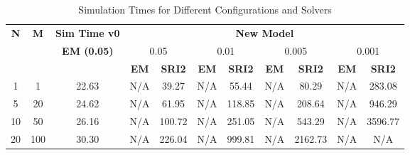 
\begin{table}[ht]
\centering
\caption{Simulation Times for Different Configurations and Solvers}
\begin{tabular}{cc|c|cccccccc}
\toprule
\multirow{2}{*}{\textbf{N}} & \multirow{2}{*}{\textbf{M}} & \textbf{Sim Time v0} & \multicolumn{8}{c}{\textbf{New Model}} \\
\cmidrule(lr){3-11}
 &  & \textbf{EM (0.05)} & \multicolumn{2}{c}{0.05} & \multicolumn{2}{c}{0.01} & \multicolumn{2}{c}{0.005} & \multicolumn{2}{c}{0.001} \\
\cmidrule(lr){4-11}
 &  &  & \textbf{EM} & \textbf{SRI2} & \textbf{EM} & \textbf{SRI2} & \textbf{EM} & \textbf{SRI2} & \textbf{EM} & \textbf{SRI2} \\
\midrule
1 & 1 & 22.63 & N/A & 39.27 & N/A & 55.44 & N/A & 80.29 & N/A & 283.08 \\
5 & 20 & 24.62 & N/A & 61.95 & N/A & 118.85 & N/A & 208.64 & N/A & 946.29 \\
10 & 50 & 26.16 & N/A & 100.72 & N/A & 251.05 & N/A & 543.29 & N/A & 3596.77 \\
20 & 100 & 30.30 & N/A & 226.04 & N/A & 999.81 & N/A & 2162.73 & N/A & N/A \\
\bottomrule
\end{tabular}
\label{tab:sim_times}
\end{table}
